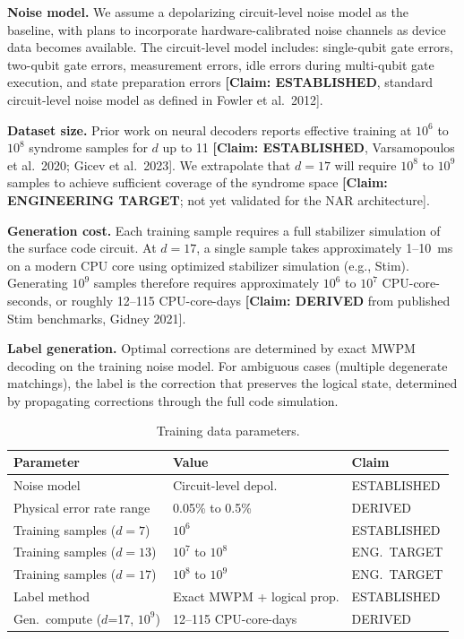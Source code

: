 \documentclass[conference]{IEEEtran}
\begin{document}
\textbf{Noise model.} We assume a depolarizing circuit-level noise model as the baseline, with plans to incorporate hardware-calibrated noise channels as device data becomes available. The circuit-level model includes: single-qubit gate errors, two-qubit gate errors, measurement errors, idle errors during multi-qubit gate execution, and state preparation errors \textbf{[Claim: ESTABLISHED}, standard circuit-level noise model as defined in Fowler et al.\ 2012].

\textbf{Dataset size.} Prior work on neural decoders reports effective training at $10^6$ to $10^8$ syndrome samples for $d$ up to 11 \textbf{[Claim: ESTABLISHED}, Varsamopoulos et al.\ 2020; Gicev et al.\ 2023]. We extrapolate that $d = 17$ will require $10^8$ to $10^9$ samples to achieve sufficient coverage of the syndrome space \textbf{[Claim: ENGINEERING TARGET}; not yet validated for the NAR architecture].

\textbf{Generation cost.} Each training sample requires a full stabilizer simulation of the surface code circuit. At $d = 17$, a single sample takes approximately 1--10~ms on a modern CPU core using optimized stabilizer simulation (e.g., Stim). Generating $10^9$ samples therefore requires approximately $10^6$ to $10^7$ CPU-core-seconds, or roughly 12--115 CPU-core-days \textbf{[Claim: DERIVED} from published Stim benchmarks, Gidney 2021].

\textbf{Label generation.} Optimal corrections are determined by exact MWPM decoding on the training noise model. For ambiguous cases (multiple degenerate matchings), the label is the correction that preserves the logical state, determined by propagating corrections through the full code simulation.

\begin{table}[H]
\centering
\caption{Training data parameters.}
\label{tab:training-data}
\footnotesize
\begin{tabularx}{\columnwidth}{L{3.0cm}L{2.5cm}l}
\toprule
\textbf{Parameter} & \textbf{Value} & \textbf{Claim} \\
\midrule
Noise model & Circuit-level depol. & ESTABLISHED \\
Physical error rate range & 0.05\% to 0.5\% & DERIVED \\
Training samples ($d = 7$) & $10^6$ & ESTABLISHED \\
Training samples ($d = 13$) & $10^7$ to $10^8$ & ENG.\ TARGET \\
Training samples ($d = 17$) & $10^8$ to $10^9$ & ENG.\ TARGET \\
Label method & Exact MWPM + logical prop. & ESTABLISHED \\
Gen.\ compute ($d$=17, $10^9$) & 12--115 CPU-core-days & DERIVED \\
\bottomrule
\end{tabularx}
\end{table}
\end{document}
